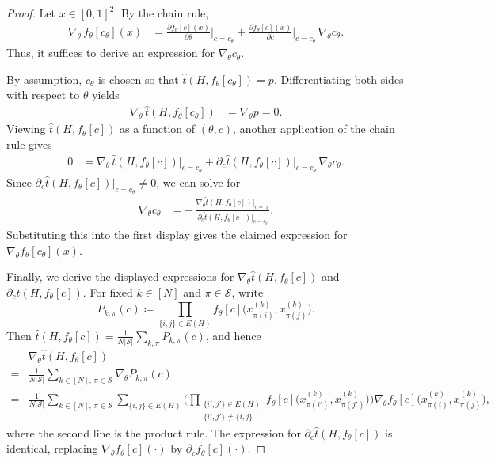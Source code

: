 \documentclass[11pt]{article}
\theoremstyle{plain}
\theoremstyle{definition}
\theoremstyle{remark}
\begin{document}
\begin{proof}
Let \(x \in [0,1]^2\). By the chain rule,
\begin{align*}
\nabla_\theta\, f_\theta[c_\theta](x)
&= \frac{\partial f_\theta[c](x)}{\partial \theta}\Big|_{c=c_\theta}
 + \frac{\partial f_\theta[c](x)}{\partial c}\Big|_{c=c_\theta}\, \nabla_\theta c_\theta.
\end{align*}
Thus, it suffices to derive an expression for \(\nabla_\theta c_\theta\).

By assumption, \(c_\theta\) is chosen so that
\(\widehat{t}(H,f_\theta[c_\theta]) = p\).
Differentiating both sides with respect to \(\theta\) yields
\begin{align*}
\nabla_\theta\,\widehat{t}(H,f_\theta[c_\theta]) &= \nabla_\theta p = 0.
\end{align*}
Viewing \(\widehat{t}(H,f_\theta[c])\) as a function of \((\theta,c)\), another application of the chain rule gives
\begin{align*}
0
&= \nabla_\theta\,\widehat{t}(H,f_\theta[c])\Big|_{c=c_\theta}
 + \partial_c\widehat{t}(H,f_\theta[c])\Big|_{c=c_\theta}\, \nabla_\theta c_\theta.
\end{align*}
Since \(\partial_c\widehat{t}(H,f_\theta[c])\big|_{c=c_\theta} \neq 0\), we can solve for
\begin{align*}
\nabla_\theta c_\theta
&= {-}\,\frac{\nabla_\theta\widehat{t}(H,f_\theta[c])\big|_{c=c_\theta}}{\partial_c\widehat{t}(H,f_\theta[c])\big|_{c=c_\theta}}.
\end{align*}
Substituting this into the first display gives the claimed expression for
\(\nabla_\theta f_\theta[c_\theta](x)\).

Finally, we derive the displayed expressions for \(\nabla_\theta\widehat{t}(H,f_\theta[c])\) and
\(\partial_c\widehat{t}(H,f_\theta[c])\). For fixed \(k\in[N]\) and \(\pi\in\mathcal{S}\), write
\[
P_{k,\pi}(c) \coloneqq \prod_{\{i,j\}\in E(H)} f_\theta[c]\bigl(x_{\pi(i)}^{(k)},x_{\pi(j)}^{(k)}\bigr).
\]
Then \(\widehat{t}(H,f_\theta[c]) = \frac{1}{N|\mathcal{S}|}\sum_{k,\pi} P_{k,\pi}(c)\), and hence
\begin{align*}
&\nabla_\theta\widehat{t}(H,f_\theta[c])
\\
{} = &\frac{1}{N|\mathcal{S}|}\sum_{k\in[N],\,\pi\in\mathcal{S}} \nabla_\theta P_{k,\pi}(c)
\\
{} = &\frac{1}{N|\mathcal{S}|}\sum_{k\in[N],\,\pi\in\mathcal{S}}
\sum_{\{i,j\}\in E(H)}
\Bigg(\prod_{\substack{\{i',j'\}\in E(H)\\ \{i',j'\}\neq\{i,j\}}}
f_\theta[c]\bigl(x_{\pi(i')}^{(k)},x_{\pi(j')}^{(k)}\bigr)\Bigg)
\nabla_\theta f_\theta[c]\bigl(x_{\pi(i)}^{(k)},x_{\pi(j)}^{(k)}\bigr),
\end{align*}
where the second line is the product rule.
The expression for \(\partial_c\widehat{t}(H,f_\theta[c])\) is identical, replacing
\(\nabla_\theta f_\theta[c](\cdot)\) by \(\partial_c f_\theta[c](\cdot)\).
\end{proof}
\end{document}
